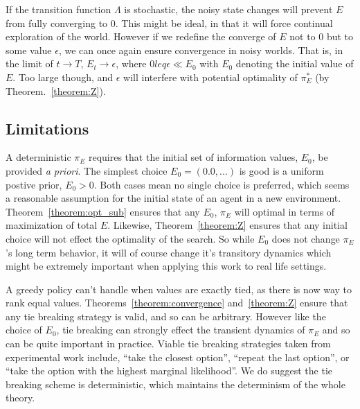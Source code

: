 \documentclass[9pt,twocolumn,twoside]{pnas-new}
\begin{document}
If the transition function $\Lambda$ is stochastic, the noisy state changes will prevent $E$ from fully converging to 0. This might be ideal, in that it will force continual exploration of the world. However if we redefine the converge of $E$ not to 0 but to some value $\epsilon$, we can once again ensure convergence in noisy worlds. That is, in the limit of $t \rightarrow T$, $E_t \rightarrow \epsilon$, where $0 leq \epsilon \ll E_0$ with $E_0$ denoting the initial value of $E$. Too large though, and $\epsilon$ will interfere with potential optimality of $\pi^*_E$ (by Theorem.~\ref{theorem:Z}). 




\subsection*{Limitations}
A deterministic $\pi_E$ requires that the initial set of information values, $E_0$, be provided \textit{a priori}. The simplest choice $E_0 = (0.0 ,... )$ is good is a uniform postive prior, $E_0 > 0$. Both cases mean no single choice is preferred, which seems a reasonable assumption for the initial state of an agent in a new environment. Theorem~\ref{theorem:opt_sub} ensures that any $E_0$, $\pi_E$ will optimal in terms of maximization of total $E$. Likewise, Theorem~\ref{theorem:Z} ensures that any initial choice will not effect the optimality of the search. So while $E_0$ does not change $\pi_E$'s long term behavior, it will of course change it's transitory dynamics which might be extremely important when applying this work to real life settings.

A greedy policy can't handle when values are exactly tied, as there is now way to rank equal values. Theorems~\ref{theorem:convergence} and~\ref{theorem:Z} ensure that any tie breaking strategy is valid, and so can be arbitrary. However like the choice of $E_0$, tie breaking can strongly effect the transient dynamics of $\pi_E$ and so can be quite important in practice. Viable tie breaking strategies taken from experimental work include, ``take the closest option'', ``repeat the last option'', or ``take the option with the highest marginal likelihood''. %
We do suggest the tie breaking scheme is deterministic, which maintains the determinism of the whole theory.
\end{document}
